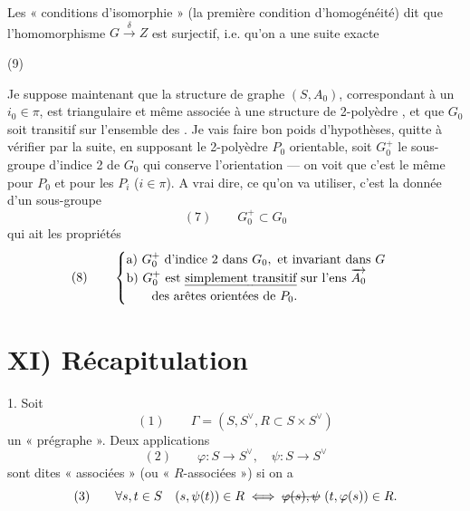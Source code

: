 \documentclass[11pt,a4paper]{article}
\begin{document}
Les « conditions d'isomorphie » (la première condition d'homogénéité) dit que l'homomorphisme $G \xrightarrow{\delta} Z$ est surjectif, i.e. qu'on a une suite exacte

(9)



Je suppose maintenant que la structure de graphe \struck{\ill{}} $(S, A_0)$, correspondant à un $i_0 \in \pi$, est triangulaire et même associée à une structure de 2-polyèdre , et que $G_0$ soit transitif sur l'ensemble des . Je vais faire bon poids d'hypothèses, quitte à vérifier par la suite, en supposant le 2-polyèdre $P_0$ orientable, soit $G_0^{+}$ le sous-groupe d'indice 2 de $G_0$ qui conserve l'orientation --- on voit que c'est le même pour $P_0$ et pour les $P_i$ ($i \in \pi$). A vrai dire, ce qu'on va utiliser, c'est la donnée d'un sous-groupe
\[
(7) \qquad G_0^{+} \subset G_0
\]
qui ait les propriétés
\[
(8) \qquad
\begin{cases}
\text{a) } G_0^{+} \text{ d'indice 2 dans } G_0, \text{ et invariant dans } G \\
\text{b) } G_0^{+} \text{ est \emph{simplement transitif} sur l'ens } \overrightarrow{A_0} \\
\qquad \text{des arêtes orientées de } P_0 .
\end{cases}
\]


\section*{XI) Récapitulation}

1. Soit
\[
(1) \qquad \Gamma = (S, S^{\vee}, R \subset S \times S^{\vee})
\]
un « prégraphe ».
Deux applications
\[
(2) \qquad \varphi : S \to S^{\vee}, \quad \psi : S \to S^{\vee}
\]
sont dites « associées » (ou « $R$-associées ») si on a
\[
(3) \qquad \forall s, t \in S \quad (s, \psi(t)) \in R \iff \text{\struck{$\varphi(s), \psi$}} \ (t, \varphi(s)) \in R .
\]
\struck{\ill{}}
\end{document}
